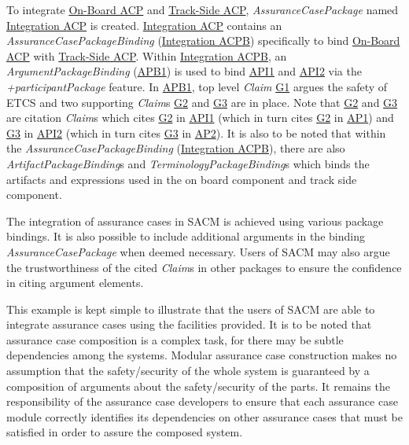 To integrate \underline{On-Board ACP} and \underline{Track-Side ACP}, \textit{AssuranceCasePackage} named \underline{Integration ACP} is created. 
\underline{Integration ACP} contains an \textit{AssuranceCasePackageBinding} (\underline{Integration ACPB}) specifically to bind \underline{On-Board ACP} with \underline{Track-Side ACP}. 
Within \underline{Integration ACPB}, an \textit{ArgumentPackageBinding} (\underline{APB1}) is used to bind \underline{API1} and \underline{API2} via the \textit{+participantPackage} feature. 
In \underline{APB1}, top level \textit{Claim} \underline{G1} argues the safety of ETCS and two supporting \textit{Claim}s \underline{G2} and \underline{G3} are in place. 
Note that \underline{G2} and \underline{G3} are citation \textit{Claim}s which cites \underline{G2} in \underline{API1} (which in turn cites \underline{G2} in \underline{AP1}) and \underline{G3} in \underline{API2} (which in turn cites \underline{G3} in \underline{AP2}). 
It is also to be noted that within the \textit{AssuranceCasePackageBinding} (\underline{Integration ACPB}), there are also \textit{ArtifactPackageBinding}s and \textit{TerminologyPackageBinding}s which binds the artifacts and expressions used in the on board component and track side component. 

The integration of assurance cases in SACM is achieved using various package bindings. 
It is also possible to include additional arguments in the binding \textit{AssuranceCasePackage} when deemed necessary. 
Users of SACM may also argue the trustworthiness of the cited \textit{Claim}s in other packages to ensure the confidence in citing argument elements. 

This example is kept simple to illustrate that the users of SACM are able to integrate assurance cases using the facilities provided.
It is to be noted that assurance case composition is a complex task, for there may be subtle dependencies among the systems. 
Modular assurance case construction makes no assumption that the safety/security of the whole system is guaranteed by a composition of arguments about the safety/security of the parts. 
It remains the responsibility of the assurance case developers to ensure that each assurance case module correctly identifies its dependencies on other assurance cases that must be satisfied in order to assure the composed system.